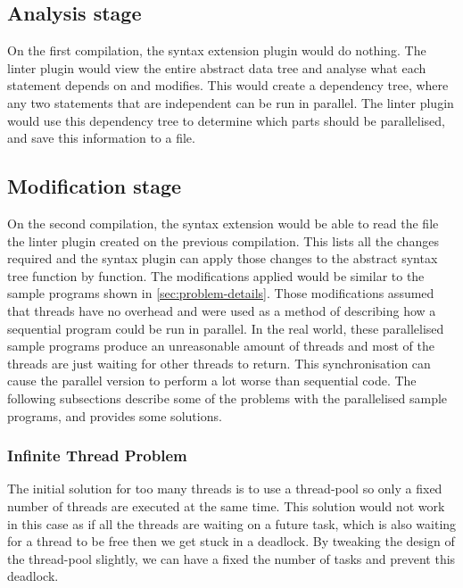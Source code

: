 \documentclass[conference]{IEEEtran}
\begin{document}
\subsection{Analysis stage}
On the first compilation, the syntax extension plugin would do nothing. The linter plugin would view the entire abstract data tree and analyse what each statement depends on and modifies. This would create a dependency tree, where any two statements that are independent can be run in parallel. The linter plugin would use this dependency tree to determine which parts should be parallelised, and save this information to a file.



\subsection{Modification stage}
On the second compilation, the syntax extension would be able to read the file the linter plugin created on the previous compilation. This lists all the changes required and the syntax plugin can apply those changes to the abstract syntax tree function by function. The modifications applied would be similar to the sample programs shown in \autoref{sec:problem-details}. Those modifications assumed that threads have no overhead and were used as a method of describing how a sequential program could be run in parallel. In the real world, these parallelised sample programs produce an unreasonable amount of threads and most of the threads are just waiting for other threads to return. This synchronisation can cause the parallel version to perform a lot worse than sequential code. The following subsections describe some of the problems with the parallelised sample programs, and provides some solutions.

\subsubsection{Infinite Thread Problem}
The initial solution for too many threads is to use a thread-pool so only a fixed number of threads are executed at the same time. This solution would not work in this case as if all the threads are waiting on a future task, which is also waiting for a thread to be free then we get stuck in a deadlock. By tweaking the design of the thread-pool slightly, we can have a fixed the number of tasks and prevent this deadlock.
\end{document}
